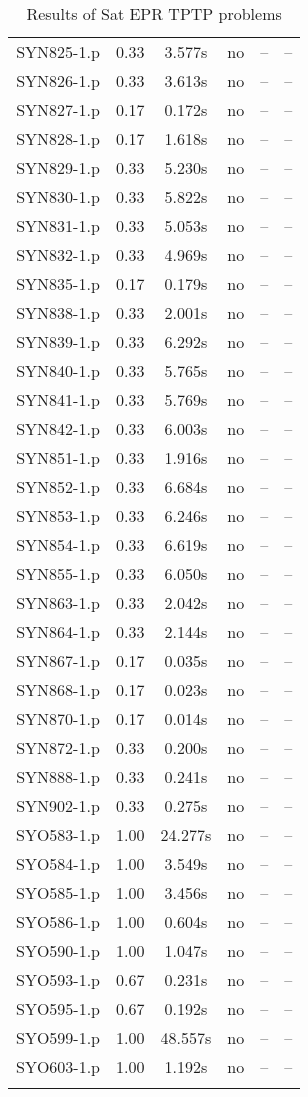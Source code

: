 \begin{longtable}{||c | c | c | c | c | c||}
SYN825-1.p & 0.33 & 3.577s & no & -- & -- \\
SYN826-1.p & 0.33 & 3.613s & no & -- & -- \\
SYN827-1.p & 0.17 & 0.172s & no & -- & -- \\
SYN828-1.p & 0.17 & 1.618s & no & -- & -- \\
SYN829-1.p & 0.33 & 5.230s & no & -- & -- \\
SYN830-1.p & 0.33 & 5.822s & no & -- & -- \\
SYN831-1.p & 0.33 & 5.053s & no & -- & -- \\
SYN832-1.p & 0.33 & 4.969s & no & -- & -- \\
SYN835-1.p & 0.17 & 0.179s & no & -- & -- \\
SYN838-1.p & 0.33 & 2.001s & no & -- & -- \\
SYN839-1.p & 0.33 & 6.292s & no & -- & -- \\
SYN840-1.p & 0.33 & 5.765s & no & -- & -- \\
SYN841-1.p & 0.33 & 5.769s & no & -- & -- \\
SYN842-1.p & 0.33 & 6.003s & no & -- & -- \\
SYN851-1.p & 0.33 & 1.916s & no & -- & -- \\
SYN852-1.p & 0.33 & 6.684s & no & -- & -- \\
SYN853-1.p & 0.33 & 6.246s & no & -- & -- \\
SYN854-1.p & 0.33 & 6.619s & no & -- & -- \\
SYN855-1.p & 0.33 & 6.050s & no & -- & -- \\
SYN863-1.p & 0.33 & 2.042s & no & -- & -- \\
SYN864-1.p & 0.33 & 2.144s & no & -- & -- \\
SYN867-1.p & 0.17 & 0.035s & no & -- & -- \\
SYN868-1.p & 0.17 & 0.023s & no & -- & -- \\
SYN870-1.p & 0.17 & 0.014s & no & -- & -- \\
SYN872-1.p & 0.33 & 0.200s & no & -- & -- \\
SYN888-1.p & 0.33 & 0.241s & no & -- & -- \\
SYN902-1.p & 0.33 & 0.275s & no & -- & -- \\
SYO583-1.p & 1.00 & 24.277s & no & -- & -- \\
SYO584-1.p & 1.00 & 3.549s & no & -- & -- \\
SYO585-1.p & 1.00 & 3.456s & no & -- & -- \\
SYO586-1.p & 1.00 & 0.604s & no & -- & -- \\
SYO590-1.p & 1.00 & 1.047s & no & -- & -- \\
SYO593-1.p & 0.67 & 0.231s & no & -- & -- \\
SYO595-1.p & 0.67 & 0.192s & no & -- & -- \\
SYO599-1.p & 1.00 & 48.557s & no & -- & -- \\
SYO603-1.p & 1.00 & 1.192s & no & -- & -- \\
		\bottomrule
		\caption{Results of Sat EPR TPTP problems}
		\label{table:sat_epr_results}
		\end{longtable}
